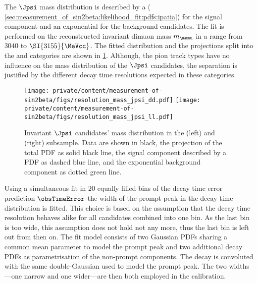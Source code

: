 The $\Jpsi$ mass distribution is described by a \Ipatia \PDF (\cf
\cref{sec:measurement_of_sin2beta:likelihood_fit:pdfs:ipatia}) for the signal
component and an exponential \PDF for the background candidates. The fit is
performed on the reconstructed invariant dimuon mass $m_{\mumu}$ in a range from
$\num{3040}$ to $\SI{3155}{\MeVcc}$. The fitted distribution and the \PDF
projections split into the \catDD and \catLL categories are shown in 
\cref{fig:measurement_of_sin2beta:resolution_and_acceptance:resolution:jpsi_mass}. 
Although, the pion track types have no influence on the mass distribution of the
$\Jpsi$ candidates, the separation is justified by the different decay time
resolutions expected in these categories.
%
\begin{figure}[h]
\texttt{[image: private/content/measurement-of-sin2beta/figs/resolution\_mass\_jpsi\_dd.pdf]}
\texttt{[image: private/content/measurement-of-sin2beta/figs/resolution\_mass\_jpsi\_ll.pdf]}
\caption{Invariant $\Jpsi$ candidates' mass distribution in the (left) \catDD
and (right) \catLL subsample. Data are shown in black, the projection of the
total \acs{PDF} as solid black line, the signal component described by a \Ipatia
\acs{PDF} as dashed blue line, and the exponential background component as
dotted green line.}
\label{fig:measurement_of_sin2beta:resolution_and_acceptance:resolution:jpsi_mass}
\end{figure}
%
Using a simultaneous fit in $\num{20}$ equally filled bins of the decay time
error prediction $\obsTimeError$ the width of the prompt peak in the decay time
distribution is fitted. This choice is based on the assumption that the decay
time resolution behaves alike for all candidates combined into one bin. As the
last bin is too wide, this assumption does not hold not any more, thus the last
bin is left out from then on. The fit model consists of two Gaussian \acp{PDF}
sharing a common mean parameter to model the prompt peak and two additional
decay \acp{PDF} as parametrisation of the non-prompt components. The decay \PDF
is convoluted with the same double-Gaussian \PDF used to model the prompt peak.
The two widths---one narrow and one wider---are then both employed in the
calibration.

